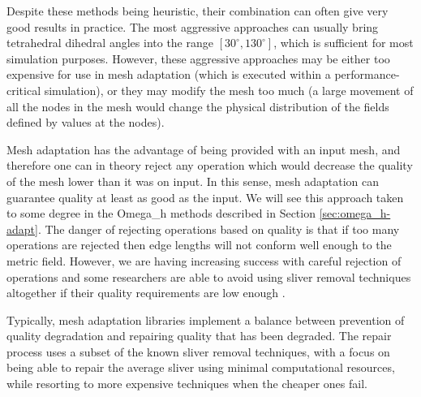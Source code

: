 Despite these methods being heuristic, their combination can often
give very good results in practice.
The most aggressive approaches
\cite{klingner2008aggressive,dassi2016tetrahedral}
can usually bring tetrahedral dihedral angles into
the range $[30^\circ,130^\circ]$, which is sufficient for
most simulation purposes.
However, these aggressive approaches may be either too expensive
for use in mesh adaptation (which is executed within a
performance-critical simulation), or they may modify the mesh
too much (a large movement of all the nodes in the mesh would
change the physical distribution of the fields defined by values
at the nodes).

Mesh adaptation has the advantage of being provided with an input
mesh, and therefore one can in theory reject any operation which
would decrease the quality of the mesh lower than it was on input.
In this sense, mesh adaptation can guarantee quality at least as good
as the input.
We will see this approach taken to some degree in the Omega\_h methods
described in Section \ref{sec:omega_h-adapt}.
The danger of rejecting operations based on quality is that
if too many operations are rejected then edge lengths will
not conform well enough to the metric field.
However, we are having increasing success with
careful rejection of operations and some researchers
are able to avoid using sliver removal techniques
altogether if their quality requirements are low
enough \cite{loseille20093d,michal2012anisotropic}.

Typically, mesh adaptation libraries implement a balance
between prevention of quality degradation and repairing
quality that has been degraded.
The repair process uses a subset of the known sliver removal
techniques, with a focus on being able to repair the average
sliver using minimal computational resources, while resorting
to more expensive techniques when the cheaper ones fail.

